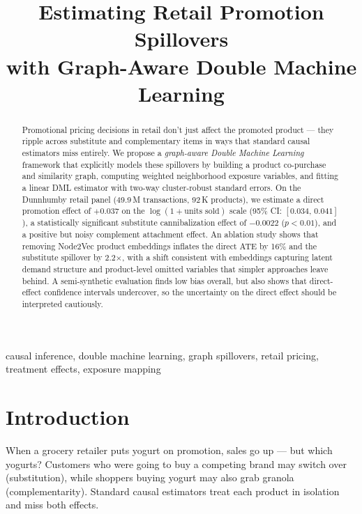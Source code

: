 \documentclass[conference]{IEEEtran}
\title{Estimating Retail Promotion Spillovers\\with Graph-Aware Double Machine Learning}
\author{
  \IEEEauthorblockN{David M. McKinney}
  \IEEEauthorblockA{Independent Researcher\\
    Ann Arbor, MI, USA}
}
\begin{document}
\maketitle

\begin{abstract}
    Promotional pricing decisions in retail don't just affect the promoted
    product --- they ripple across substitute and complementary items in ways
    that standard causal estimators miss entirely.
    We propose a \emph{graph-aware Double Machine Learning} framework that
    explicitly models these spillovers by building a product co-purchase
    and similarity graph, computing weighted neighborhood exposure variables,
    and fitting a linear DML estimator with two-way cluster-robust standard
    errors.
    On the Dunnhumby retail panel (49.9\,M transactions, 92\,K products),
    we estimate a direct promotion effect of $+0.037$ on the
    $\log(1 + \text{units sold})$ scale
    (95\% CI: $[0.034,\, 0.041]$), a statistically significant substitute
    cannibalization effect of $-0.0022$ ($p < 0.01$), and a positive but
    noisy complement attachment effect.
    An ablation study shows that removing Node2Vec product embeddings inflates
    the direct ATE by 16\% and the substitute spillover by 2.2$\times$,
    with a shift consistent with embeddings capturing latent demand structure
    and product-level omitted variables that simpler approaches leave behind.
    A semi-synthetic evaluation finds low bias overall, but also shows that
    direct-effect confidence intervals undercover, so the uncertainty on the
    direct effect should be interpreted cautiously.
\end{abstract}

\begin{IEEEkeywords}
    causal inference, double machine learning, graph spillovers,
    retail pricing, treatment effects, exposure mapping
\end{IEEEkeywords}


\section{Introduction}

When a grocery retailer puts yogurt on promotion, sales go up --- but
which yogurts? Customers who were going to buy a competing brand may switch
over (substitution), while shoppers buying yogurt may also grab granola
(complementarity).
Standard causal estimators treat each product in isolation and miss both
effects.
\end{document}
